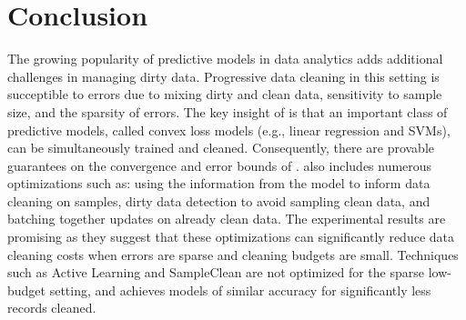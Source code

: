 \vspace{-1em}
\section{Conclusion}
The growing popularity of predictive models in data analytics adds additional challenges in managing dirty data.
Progressive data cleaning in this setting is succeptible to errors due to mixing dirty and clean data, sensitivity to sample size, and the sparsity of errors.
The key insight of \sys is that an important class of predictive models, called convex loss models (e.g., linear regression and SVMs), can be simultaneously trained and cleaned.
Consequently, there are provable guarantees on the convergence and error bounds of \sys.  
\sys also includes numerous optimizations such as: using the information from the model to inform data cleaning on samples, dirty data detection to avoid sampling clean data, and batching together updates on already clean data.
The experimental results are promising as they suggest that these optimizations can significantly reduce data cleaning costs when errors are sparse and cleaning budgets are small.
Techniques such as Active Learning and SampleClean are not optimized for the sparse low-budget setting, and \sys achieves models of similar accuracy for significantly less records cleaned.

